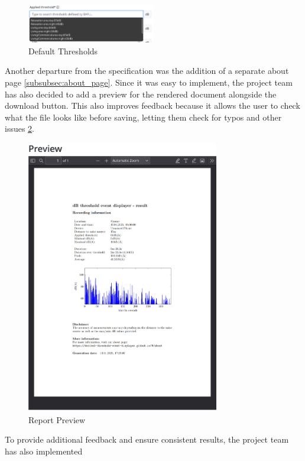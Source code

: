 \begin{figure}[H]
    \centering
    \includegraphics[width=0.5\textwidth]{../assets/implementation_threshold.png}
    \caption{Default Thresholds}\label{fig:implementation-threshold}
\end{figure}
Another departure from the specification was the addition of a separate about page \ref{subsubsec:about_page}. Since it was easy to implement,
the project team has also decided to add a preview for the rendered document alongside the download button. This also improves feedback because it allows the user to
check what the file looks like before saving, letting them check for typos and other issues \ref{fig:implementation-preview}.
\begin{figure}[H]
    \centering
    \includegraphics[width=0.75\textwidth]{../assets/implementation_preview.png}
    \caption{Report Preview}\label{fig:implementation-preview}
\end{figure}
To provide additional feedback and ensure consistent results, the project team has also implemented
